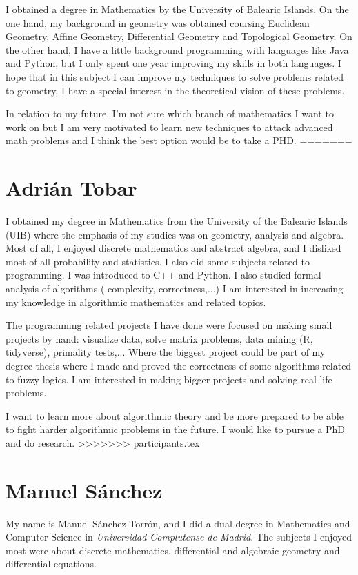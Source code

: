 \documentclass[11pt]{amsart}
\begin{document}
I obtained a degree in Mathematics by the University of Balearic Islands. On the one hand, my background in geometry was obtained coursing Euclidean Geometry, Affine Geometry, Differential Geometry and Topological Geometry.
On the other hand, I have a little background programming with languages like Java and Python, but I only spent one year improving my skills in both languages. 
I hope that in this subject I can improve my techniques to solve problems related to geometry, I have a special interest in the theoretical vision of these problems.

In relation to my future, I'm not sure which branch of mathematics I want to work on but  I am very motivated to learn new techniques to attack advanced math problems and I think the best option would be to take a PHD.
=======
\section*{Adrián Tobar}


I obtained my degree in Mathematics from the University of the Balearic Islands (UIB) where the emphasis of my studies was on geometry, analysis and algebra.
Most of all, I enjoyed discrete mathematics and abstract algebra, and I disliked most of all probability and statistics.
I also did some subjects related to programming. I was introduced to C++ and Python. I also studied formal analysis of algorithms ( complexity, correctness,...)
I am interested in increasing my knowledge in algorithmic mathematics and related topics.

The programming related projects I have done were focused on making small projects by hand: visualize data, solve matrix problems, data mining (R, tidyverse),
primality tests,... Where the biggest project could be part of my degree thesis where I made and proved the correctness of some algorithms related to fuzzy logics.
I am interested in making bigger projects and solving real-life problems.

I want to learn more about algorithmic theory and be more prepared to be able to fight harder algorithmic problems in the future.  I would like to pursue a PhD and do research.
>>>>>>> participants.tex


\medskip

\section*{Manuel Sánchez}

My name is Manuel Sánchez Torrón, and I did a dual degree in Mathematics and Computer Science in \textit{Universidad Complutense de Madrid}.
The subjects I enjoyed most were about discrete mathematics, differential and algebraic geometry and differential equations.
\end{document}
